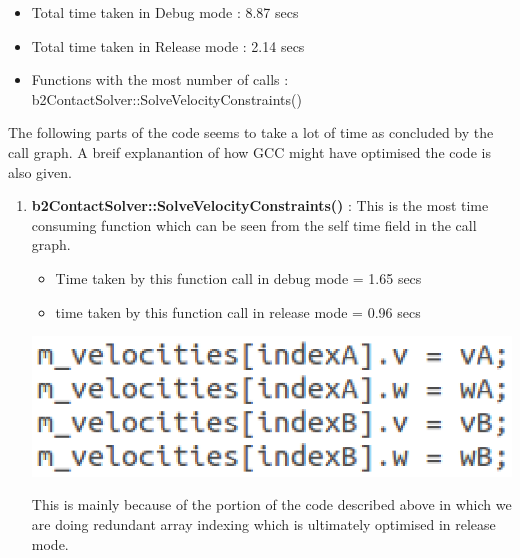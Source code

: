 \documentclass[11pt, a4paper]{article}
\begin{document}
\begin{itemize}
\item Total time taken in Debug mode : 8.87 secs
\item Total time taken in Release mode : 2.14 secs
\item Functions with the most number of calls : b2ContactSolver::SolveVelocityConstraints()
\end{itemize}

The following parts of the code seems to take a lot of time as concluded by the call graph. A breif explanantion of how GCC might have optimised the code is also given.
\begin{enumerate}
\item \textbf{b2ContactSolver::SolveVelocityConstraints()} : This is the most time consuming function which can be seen from the self time field in the call graph. 
\begin{itemize}
\item Time taken by this function call in debug mode = 1.65 secs
\item time taken by this function call in release mode = 0.96 secs
\end{itemize}
\begin{center}
\includegraphics{ReportImages/point1.eps}
\end{center}
This is mainly because of the portion of the code described above in which we are doing redundant array indexing which is ultimately optimised in release mode.



\end{enumerate}
\end{document}

